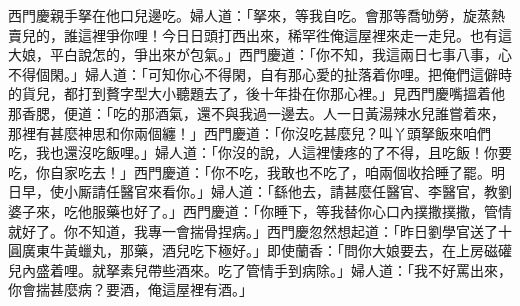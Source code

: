 西門慶親手拏在他口兒邊吃。婦人道：「拏來，等我自吃。會那等喬劬勞，旋蒸熱賣兒的，{}誰這裡爭你哩！{}{}今日日頭打西出來，稀罕徃俺這屋裡來走一走兒。也有這大娘，平白說怎的，爭出來が包氣。」西門慶道：「你不知，我這兩日七事八事，心不得個閑。」{}婦人道：「可知你心不得閑，自有那心愛的扯落着你哩。把俺們這僻時的貨兒，都打到贅字型大小聽題去了，後十年掛在你那心裡。」{}見西門慶嘴搵着他那香腮，便道：「吃的那酒氣，還不與我過一邊去。人一日黃湯辣水兒誰嘗着來，那裡有甚麼神思和你兩個纏！」西門慶道：「你沒吃甚麼兒？叫丫頭拏飯來咱們吃，我也還沒吃飯哩。」婦人道：「你沒的說，人這裡悽疼的了不得，且吃飯！你要吃，你自家吃去！」西門慶道：「你不吃，我敢也不吃了，咱兩個收拾睡了罷。明日早，使小厮請任醫官來看你。」婦人道：「繇他去，請甚麼任醫官、李醫官，教劉婆子來，吃他服藥也好了。」西門慶道：「你睡下，等我替你心口內撲撒撲撒，管情就好了。你不知道，我專一會揣骨捏病。」{}西門慶忽然想起道：「昨日劉學官送了十圓廣東牛黃蠟丸，那藥，酒兒吃下極好。」即使蘭香：「問你大娘要去，在上房磁礶兒內盛着哩。就拏素兒帶些酒來。吃了管情手到病除。」婦人道：「我不好罵出來，你會揣甚麼病？要酒，俺這屋裡有酒。」

